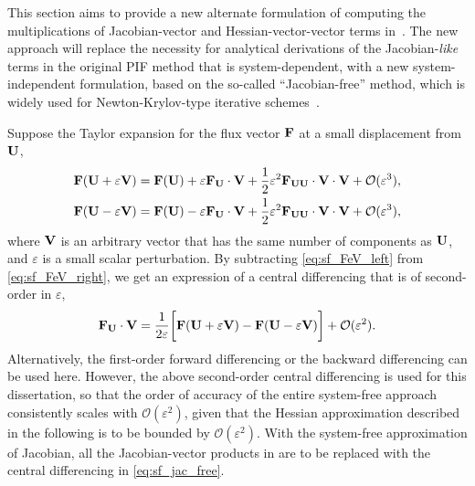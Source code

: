 This section aims to provide a new alternate formulation of computing
the multiplications of Jacobian-vector and Hessian-vector-vector terms in~.
The new approach will replace the necessity for analytical derivations
of the Jacobian-\textit{like} terms in the original PIF method that is system-dependent,
with a new system-independent formulation, based on the so-called ``Jacobian-free'' method,
which is widely used for Newton-Krylov-type
iterative schemes~\cite{gear1983iterative,brown1990hybrid,knoll2004jacobian,knoll2011application}.

Suppose the Taylor expansion for the flux vector \( \mathbf{F} \) at a small displacement from \( \mathbf{U} \),
\begin{subequations}\label{eq:sf_FeV}
    \begin{align}
        \label{eq:sf_FeV_right}\mathbf{F} ( \mathbf{U} + \varepsilon \mathbf{V}) =
        \mathbf{F}(\mathbf{U}) + \varepsilon \mathbf{F}_{\mathbf{U}} \cdot \mathbf{V} +
        \frac{1}{2} \varepsilon^{2} \mathbf{F}_{\mathbf{U}\mathbf{U}} \cdot \mathbf{V} \cdot \mathbf{V} + \mathcal{O}(\varepsilon^{3}), \\
        \label{eq:sf_FeV_left}\mathbf{F} ( \mathbf{U} - \varepsilon \mathbf{V}) =
        \mathbf{F}(\mathbf{U}) - \varepsilon \mathbf{F}_{\mathbf{U}} \cdot \mathbf{V} +
        \frac{1}{2} \varepsilon^{2} \mathbf{F}_{\mathbf{U}\mathbf{U}} \cdot \mathbf{V} \cdot \mathbf{V} + \mathcal{O}(\varepsilon^{3}),
    \end{align}
\end{subequations}
where \( \mathbf{V} \) is an arbitrary vector that has
the same number of components as \( \mathbf{U} \), and \( \varepsilon \) is a
small scalar perturbation.
By subtracting \cref{eq:sf_FeV_left} from \cref{eq:sf_FeV_right},
we get an expression of a central differencing that is of second-order in $\varepsilon$,
\begin{equation}\label{eq:sf_jac_free}
    \mathbf{F}_{\mathbf{U}} \cdot \mathbf{V} = \frac{1}{2\varepsilon}
    \bigg[ \mathbf{F}(\mathbf{U} + \varepsilon \mathbf{V}) -\mathbf{F}(\mathbf{U} - \varepsilon \mathbf{V}) \bigg]
    + \mathcal{O} ( \varepsilon^{2} ).
\end{equation}
Alternatively, the first-order forward differencing or the backward differencing can be used here.
However, the above second-order central differencing is used for this dissertation,
so that the order of accuracy of the entire system-free approach consistently scales with \( \mathcal{O}(\varepsilon^{2}) \),
given that the Hessian approximation described in the following is to be bounded by \( \mathcal{O}(\varepsilon^{2}) \).
With the system-free approximation of Jacobian, all the Jacobian-vector products in 
are to be replaced with the central differencing in \cref{eq:sf_jac_free}.

